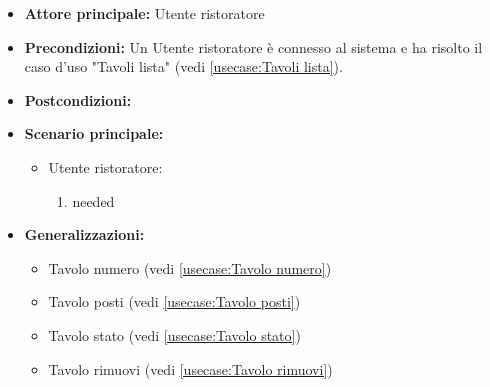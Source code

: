 \label{usecase:Tavolo dettaglio}
\begin{itemize}
	\item \textbf{Attore principale:} Utente ristoratore
	\item \textbf{Precondizioni:}
	      Un Utente ristoratore è connesso al sistema e ha risolto il caso d'uso "Tavoli lista" (vedi \autoref{usecase:Tavoli lista}).
	\item \textbf{Postcondizioni:}
	\item \textbf{Scenario principale:}
	      \begin{itemize}
		      \item Utente ristoratore:
		            \begin{enumerate}
			            \item needed
		            \end{enumerate}
	      \end{itemize}
	\item \textbf{Generalizzazioni:}
	      \begin{itemize}
		      \item Tavolo numero (vedi \autoref{usecase:Tavolo numero})\item Tavolo posti (vedi \autoref{usecase:Tavolo posti})\item Tavolo stato (vedi \autoref{usecase:Tavolo stato})\item Tavolo rimuovi (vedi \autoref{usecase:Tavolo rimuovi})
	      \end{itemize}
\end{itemize}
